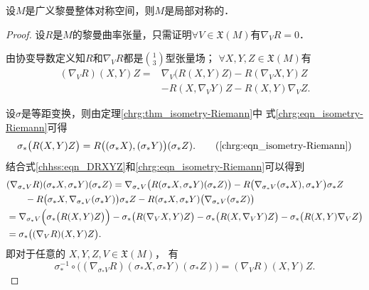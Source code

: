 \begin{theorem}
    设$M$是广义黎曼整体对称空间，则$M$是局部对称的．
\end{theorem}
\begin{proof}
设$R$是$M$的黎曼曲率张量，只需证明$\forall V\in \mathfrak{X}(M)$有$\nabla_V R=0$．

由协变导数定义知$R$和$\nabla_V R$都是$\binom{1}{3}$型张量场；
$\forall X, Y, Z \in \mathfrak{X}(M)$有
\begin{equation}\label{chhss:eqn_DRXYZ}
    \begin{aligned}
             (\nabla_V R)(X, Y) Z = &\nabla_V\bigl(R(X, Y) Z\bigr)  
        - R(\nabla_V X, Y) Z \\
        &- R (X, \nabla_V Y)Z- R (X, Y) \nabla_V Z   .
    \end{aligned}
\end{equation} %

设$\sigma$是等距变换，则由定理\ref{chrg:thm_isometry-Riemann}中
式\eqref{chrg:eqn_isometry-Riemann}可得
\begin{equation}
    \sigma_{*}\bigl(R (X, Y) Z\bigr) = R \bigl((\sigma_{*} X), (\sigma_{*} Y)\bigr) 
     (\sigma_{*} Z) . \tag{\ref{chrg:eqn_isometry-Riemann}}
\end{equation}
结合式\eqref{chhss:eqn_DRXYZ}和\eqref{chrg:eqn_isometry-Riemann}可以得到
\begin{align*}
    & (\nabla_{\sigma_* V} R)(\sigma_* X, \sigma_* Y)(\sigma_* Z) 
     =\nabla_{\sigma_* V}\bigl(R (\sigma_* X, \sigma_* Y)(\sigma_*Z )\bigr) 
      -R\bigl(\nabla_{\sigma_* V} (\sigma_* X), \sigma_* Y\bigr) \sigma_* Z \\ 
    &\qquad -R\bigl(\sigma_* X, \nabla_{\sigma_*V}(\sigma_* Y)\bigr)\sigma_* Z
      -R(\sigma_* X, \sigma_* Y)\bigl(\nabla_{\sigma_* V }(\sigma_* Z)\bigr) \\
    & =\nabla_{\sigma_* V}\Bigl(\sigma_*\bigl(R(X, Y) Z\bigr)\Bigr) 
      -\sigma_* \bigl(R(\nabla_V X, Y) Z\bigr) 
      -\sigma_* \bigl(R(X, \nabla_V Y) Z\bigr)-\sigma_*\bigl(R(X, Y)\nabla_V Z\bigr) \\
    & =\sigma_* \bigl((\nabla_V R)(X, Y) Z\bigr) . 
\end{align*}  %
即对于任意的 $X, Y, Z, V \in \mathfrak{X}(M)$， 有
\begin{equation}\label{chhss:eqn_sDR}
  \sigma_*^{-1} \circ\bigl((\nabla_{\sigma_*V } R)(\sigma_* X, \sigma_* Y)(\sigma_* Z) \bigr)
  =(\nabla_V R)(X, Y) Z .
\end{equation}


\end{proof}
